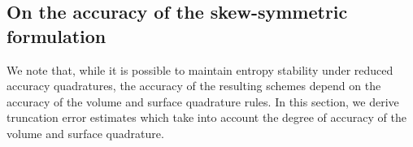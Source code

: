 \documentclass{svjour3}                     %
\renewcommand{\note}[1]{{\color{blue}{#1}}}
\begin{document}
%
%
%

\subsection{On the accuracy of the skew-symmetric formulation}

We note that, while it is possible to maintain entropy stability under reduced accuracy quadratures, the accuracy of the resulting schemes depend on the accuracy of the volume and surface quadrature rules.  In this section, we derive truncation error estimates which take into account the degree of accuracy of the volume and surface quadrature.  
\end{document}
